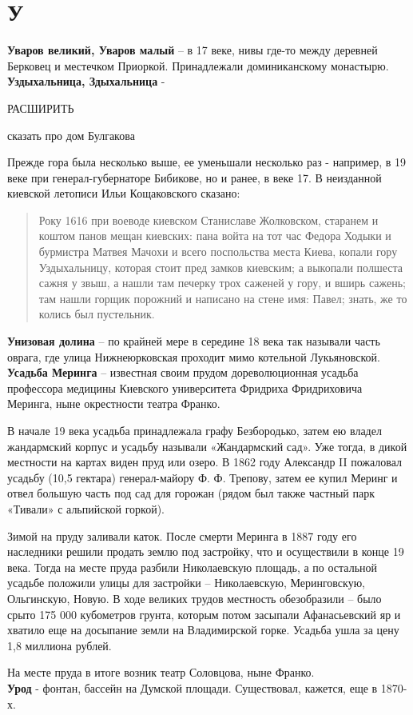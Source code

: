 \chapter*{У}

\textbf{Уваров великий, Уваров малый} – в 17 веке, нивы где-то между деревней Берковец и местечком Приоркой. Принадлежали доминиканскому монастырю.\\

\textbf{Уздыхальница, Здыхальница} - 

РАСШИРИТЬ

сказать про дом Булгакова

Прежде гора была несколько выше, ее уменьшали несколько раз - например, в 19 веке при генерал-губернаторе Бибикове, но и ранее, в веке 17. В неизданной киевской летописи Ильи Кощаковского сказано: 

\begin{quotation}
Року 1616 при воеводе киевском Станиславе Жолковском, старанем и коштом панов мещан киевских: пана войта на тот час Федора Ходыки и бурмистра Матвея Мачохи и всего поспольства места Киева, копали гору Уздыхальницу, которая стоит пред замков киевским; а выкопали полшеста сажня у звыш, а нашли там печерку трох саженей у гору, и вширь сажень; там нашли горщик порожний и написано на стене имя: Павел; знать, же то колись был пустельник.\end{quotation}



\textbf{Унизовая долина} – по крайней мере в середине 18 века так называли часть оврага, где улица Нижнеюрковская проходит мимо котельной Лукьяновской.\\

\textbf{Усадьба Меринга} – известная своим прудом дореволюционная усадьба профессора медицины Киевского университета Фридриха Фридриховича Меринга, ныне окрестности театра Франко.

В начале 19 века усадьба принадлежала графу  Безбородько, затем ею владел жандармский корпус и усадьбу называли «Жандармский сад». Уже тогда, в дикой местности на картах виден пруд или озеро. В 1862 году Александр II пожаловал усадьбу (10,5 гектара) гене\-рал-майору Ф. Ф. Трепову, затем ее купил Меринг и отвел большую часть под сад для горожан (рядом был также частный парк «Тивали» с альпийской горкой). 

Зимой на пруду заливали каток. После смерти Меринга в 1887 году его наследники решили продать землю под застройку, что и осуществили в конце 19 века. Тогда на месте пруда разбили Николаевскую площадь, а по остальной усадьбе положили улицы для застройки – Николаевскую, Меринговскую, Ольгинскую, Новую. В ходе великих трудов местность обезобразили – было срыто 175 000 кубометров грунта, которым потом засыпали Афанасьевский яр и хватило еще на досыпание земли на Владимирской горке. Усадьба ушла за цену 1,8 миллиона рублей.

На месте пруда в итоге возник театр Соловцова, ныне Франко.\\

\textbf{Урод} - фонтан, бассейн на Думской площади. Существовал, кажется, еще в 1870-х.\\
